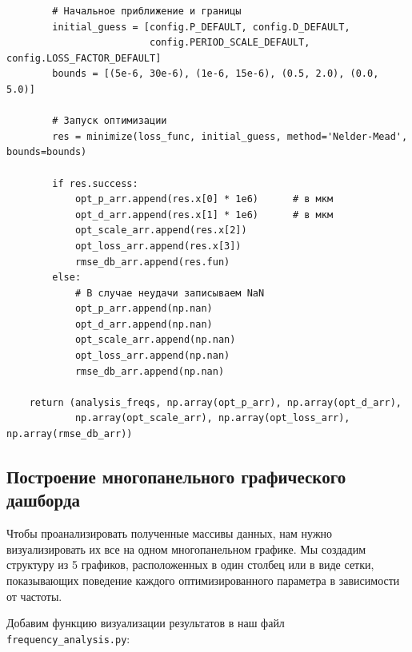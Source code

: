 \begin{verbatim}
        # Начальное приближение и границы
        initial_guess = [config.P_DEFAULT, config.D_DEFAULT, 
                         config.PERIOD_SCALE_DEFAULT, config.LOSS_FACTOR_DEFAULT]
        bounds = [(5e-6, 30e-6), (1e-6, 15e-6), (0.5, 2.0), (0.0, 5.0)]
        
        # Запуск оптимизации
        res = minimize(loss_func, initial_guess, method='Nelder-Mead', bounds=bounds)
        
        if res.success:
            opt_p_arr.append(res.x[0] * 1e6)      # в мкм
            opt_d_arr.append(res.x[1] * 1e6)      # в мкм
            opt_scale_arr.append(res.x[2])
            opt_loss_arr.append(res.x[3])
            rmse_db_arr.append(res.fun)
        else:
            # В случае неудачи записываем NaN
            opt_p_arr.append(np.nan)
            opt_d_arr.append(np.nan)
            opt_scale_arr.append(np.nan)
            opt_loss_arr.append(np.nan)
            rmse_db_arr.append(np.nan)
            
    return (analysis_freqs, np.array(opt_p_arr), np.array(opt_d_arr), 
            np.array(opt_scale_arr), np.array(opt_loss_arr), np.array(rmse_db_arr))
\end{verbatim}

\subsection{Построение многопанельного графического дашборда}

Чтобы проанализировать полученные массивы данных, нам нужно визуализировать их все на одном многопанельном графике. Мы создадим структуру из 5 графиков, расположенных в один столбец или в виде сетки, показывающих поведение каждого оптимизированного параметра в зависимости от частоты.

Добавим функцию визуализации результатов в наш файл \texttt{frequency\_analysis.py}:

